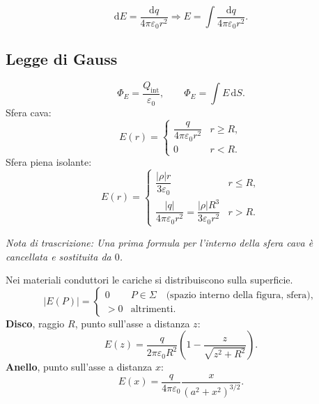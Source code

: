 \documentclass[a4paper,11pt]{article}
\newcommand{\orig}[1]{\clearpage}
\newcommand{\nota}[1]{\par\small\textit{Nota di trascrizione: #1}\par\normalsize}
\newcommand{\dd}{\mathrm{d}}
\begin{document}
\begin{center}\end{center}
\[\dd E=\frac{\dd q}{4\pi\varepsilon_0r^2}\Rightarrow E=\int\frac{\dd q}{4\pi\varepsilon_0r^2}.\]
\subsection*{Legge di Gauss}
\[\Phi_E=\frac{Q_{\mathrm{int}}}{\varepsilon_0},\qquad \Phi_E=\int E\,\dd S.\]
Sfera cava:
\[E(r)=\begin{cases}\dfrac q{4\pi\varepsilon_0r^2}&r\ge R,\\0&r<R.\end{cases}\]
Sfera piena isolante:
\[E(r)=\begin{cases}\dfrac{|\rho|r}{3\varepsilon_0}&r\le R,\\[4pt]\dfrac{|q|}{4\pi\varepsilon_0r^2}=\dfrac{|\rho|R^3}{3\varepsilon_0r^2}&r>R.\end{cases}\]
\nota{Una prima formula per l'interno della sfera cava è cancellata e sostituita da $0$.}
\orig{9}
Nei materiali conduttori le cariche si distribuiscono sulla superficie.
\[|E(P)|=\begin{cases}0&P\in\Sigma\quad\text{(spazio interno della figura, sfera)},\\>0&\text{altrimenti}.\end{cases}\]
\textbf{Disco}, raggio $R$, punto sull'asse a distanza $z$:
\[E(z)=\frac q{2\pi\varepsilon_0R^2}\left(1-\frac z{\sqrt{z^2+R^2}}\right).\]
\textbf{Anello}, punto sull'asse a distanza $x$:
\[E(x)=\frac q{4\pi\varepsilon_0}\frac{x}{(a^2+x^2)^{3/2}}.\]
\begin{center}\end{center}
\end{document}
